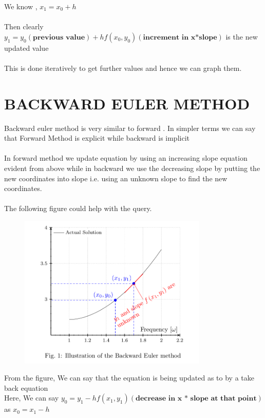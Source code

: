 \documentclass{article}
\begin{document}
\newpage
We know , $x_1 = x_0 + h$ \\
\\
Then clearly $ y_1 = y_0(\textbf{previous value}) + hf(x_0,y_0)(\textbf{increment in x*slope}) $ is the new updated value \\
\\
This is done iteratively to get further values and hence we can graph them.\\ 

\section*{BACKWARD EULER METHOD}

Backward euler method is very similar to forward . In simpler terms we can say that Forward Method is explicit while backward is implicit \\
\\
In forward method we update equation by using an increasing slope equation evident from above while in backward we use the decreasing slope by putting the new coordinates into slope i.e. using an unknown slope to find the new coordinates.\\ 
\\
The following figure could help with the query.
\begin{figure}[h!] %
  \centering
  \includegraphics[width=0.8\textwidth]{fig2.png}
\end{figure}
\newpage
From the figure, We can say that the equation is being updated as to by a take back equation\\
Here, We can say $y_0 = y_1 - hf(x_1,y_1)(\textbf{decrease in x * slope at that point})$ as $x_0 = x_1 - h $ \\
\end{document}
